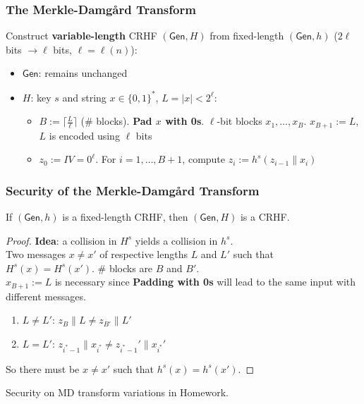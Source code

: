 \begin{frame}\frametitle{The Merkle-Damg\r{a}rd Transform}
\begin{figure}
\begin{center}

\end{center}
\end{figure}
\begin{construction}
Construct \textbf{variable-length} CRHF $(\mathsf{Gen}, H)$ from fixed-length $(\mathsf{Gen}, h)$ ($2\ell$ bits $\to \ell$ bits, $\ell = \ell(n)$):
\begin{itemize}
\item $\mathsf{Gen}$: remains unchanged
\item $H$: key $s$ and string $x \in \{0,1\}^*$, $L=|x|< 2^{\ell}$:
\begin{itemize}
\item $B := \lceil \frac{L}{\ell} \rceil$ (\# blocks). \textbf{Pad $x$ with 0s}.  $\ell$-bit blocks $x_1,\dotsc,x_B$. $x_{B+1} := L$, $L$ is encoded using $\ell$ bits
\item $z_0 := IV = 0^\ell$. For $i=1,\dotsc,B+1$, compute $z_i := h^s(z_{i-1}\| x_i)$
\end{itemize}
\end{itemize}
\end{construction}
\end{frame}
\begin{frame}\frametitle{Security of the Merkle-Damg\r{a}rd Transform}
\begin{theorem}
If $(\mathsf{Gen},h)$ is a fixed-length CRHF, then $(\mathsf{Gen},H)$ is a CRHF.
\end{theorem}
\begin{proof}
\textbf{Idea}: a collision in $H^s$ yields a collision in $h^s$. \\
Two messages $x \ne x'$ of respective lengths $L$ and $L'$ such that $H^s(x) = H^s(x')$. \# blocks are $B$ and $B'$. \\
$x_{B+1} := L$ is necessary since \textbf{Padding with 0s} will lead to the same input with different messages.
\begin{enumerate}
\item $L \ne L'$: $z_B\| L \ne z_{B'}\| L'$
\item $L = L'$: $z_{i^*-1}\| x_{i^*} \ne z_{i^*-1}'\| x_{i^*}'$
\end{enumerate}
So there must be $x \neq x'$ such that $h^s(x) = h^s(x')$.
\end{proof}
Security on MD transform variations in Homework.
\end{frame}
